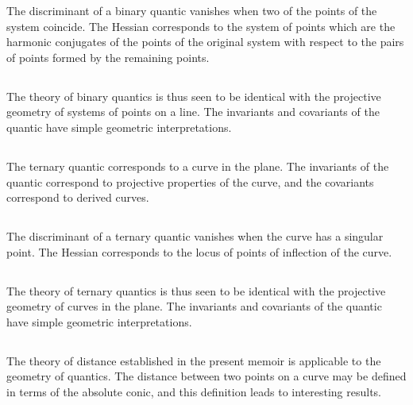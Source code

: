 \documentclass[12pt,a4paper]{article}
\begin{document}
The discriminant of a binary quantic vanishes when two of the points of the system coincide. The Hessian corresponds to the system of points which are the harmonic conjugates of the points of the original system with respect to the pairs of points formed by the remaining points.

\subsection{}

The theory of binary quantics is thus seen to be identical with the projective geometry of systems of points on a line. The invariants and covariants of the quantic have simple geometric interpretations.

\subsection{}

The ternary quantic corresponds to a curve in the plane. The invariants of the quantic correspond to projective properties of the curve, and the covariants correspond to derived curves.

\subsection{}

The discriminant of a ternary quantic vanishes when the curve has a singular point. The Hessian corresponds to the locus of points of inflection of the curve.

\subsection{}

The theory of ternary quantics is thus seen to be identical with the projective geometry of curves in the plane. The invariants and covariants of the quantic have simple geometric interpretations.

\subsection{}

The theory of distance established in the present memoir is applicable to the geometry of quantics. The distance between two points on a curve may be defined in terms of the absolute conic, and this definition leads to interesting results.

\subsection{}
\end{document}
